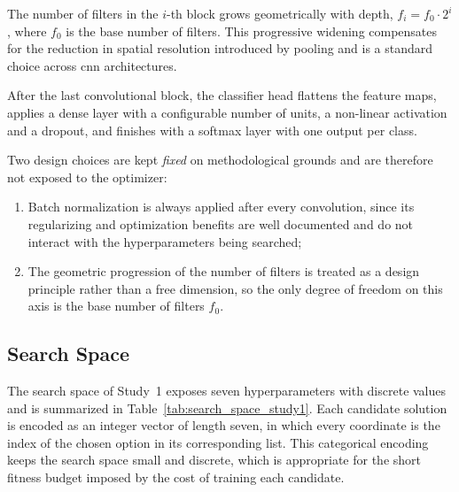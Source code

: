The number of filters in the $i$-th block grows geometrically with depth, $f_i = f_0 \cdot 2^{i}$, where $f_0$ is the base number of filters. This progressive widening compensates for the reduction in spatial resolution introduced by pooling and is a standard choice across \acrshort{cnn} architectures.

After the last convolutional block, the classifier head flattens the feature maps, applies a dense layer with a configurable number of units, a non-linear activation and a dropout, and finishes with a softmax layer with one output per class.

Two design choices are kept \emph{fixed} on methodological grounds and are therefore not exposed to the optimizer:

\begin{enumerate}
    \item Batch normalization is always applied after every convolution, since its regularizing and optimization benefits are well documented and do not interact with the hyperparameters being searched;
    \item The geometric progression of the number of filters is treated as a design principle rather than a free dimension, so the only degree of freedom on this axis is the base number of filters $f_0$.
\end{enumerate}

\subsection{Search Space}
\label{subsec:search_space}

The search space of Study~1 exposes seven hyperparameters with discrete values and is summarized in Table~\ref{tab:search_space_study1}. Each candidate solution is encoded as an integer vector of length seven, in which every coordinate is the index of the chosen option in its corresponding list. This categorical encoding keeps the search space small and discrete, which is appropriate for the short fitness budget imposed by the cost of training each candidate.

